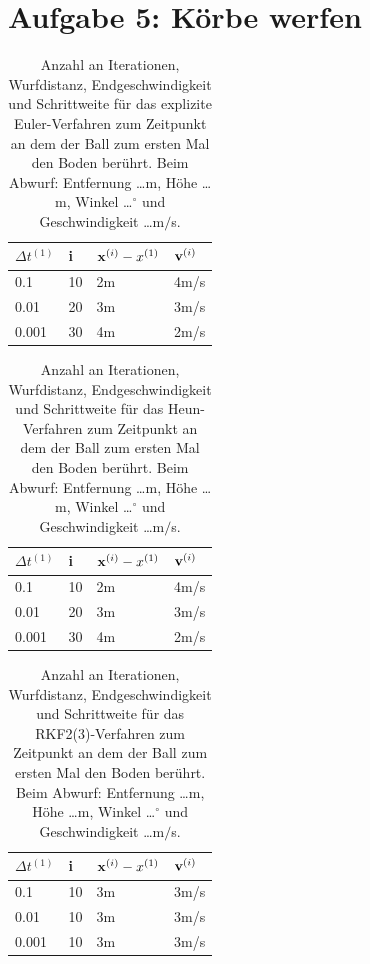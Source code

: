 \documentclass{article}
\begin{document}
\section*{Aufgabe 5: K\"orbe werfen}
\begin{table}[h!]
	\centering
	\begin{tabular}{l || l | l | l }
		\(\Delta t^{(1)}\) & i  & \({\bf x}^{(i)}-x^{(1)}\) & \({\bf v}^{(i)}\) \\
		\hline
		0.1                & 10 & 2m                        & 4m/s              \\
		0.01               & 20 & 3m                        & 3m/s              \\
		0.001              & 30 & 4m                        & 2m/s
	\end{tabular}
	\caption{Anzahl an Iterationen, Wurfdistanz, Endgeschwindigkeit und Schrittweite f\"ur das explizite Euler-Verfahren zum Zeitpunkt an dem der Ball zum ersten Mal den Boden ber\"uhrt. Beim Abwurf: Entfernung \ldots m, H\"ohe \ldots m, Winkel \ldots$^\circ$ und Geschwindigkeit \ldots m$/$s. }
	\label{tab:expEul}
\end{table}
\begin{table}[h!]
	\centering
	\begin{tabular}{l || l | l | l }
		\(\Delta t^{(1)}\) & i  & \({\bf x}^{(i)}-x^{(1)}\) & \({\bf v}^{(i)}\) \\
		\hline
		0.1                & 10 & 2m                        & 4m/s              \\
		0.01               & 20 & 3m                        & 3m/s              \\
		0.001              & 30 & 4m                        & 2m/s
	\end{tabular}
	\caption{Anzahl an Iterationen, Wurfdistanz, Endgeschwindigkeit und Schrittweite f\"ur das Heun-Verfahren zum Zeitpunkt an dem der Ball zum ersten Mal den Boden ber\"uhrt. Beim Abwurf: Entfernung \ldots m, H\"ohe \ldots m, Winkel \ldots$^\circ$ und Geschwindigkeit \ldots m$/$s. }
	\label{tab:Heun}
\end{table}
\begin{table}[h!]
	\centering
	\begin{tabular}{l || l | l | l }
		\(\Delta t^{(1)}\) & i  & \({\bf x}^{(i)}-x^{(1)}\) & \({\bf v}^{(i)}\) \\
		\hline
		0.1                & 10 & 3m                        & 3m/s              \\
		0.01               & 10 & 3m                        & 3m/s              \\
		0.001              & 10 & 3m                        & 3m/s
	\end{tabular}
	\caption{Anzahl an Iterationen, Wurfdistanz, Endgeschwindigkeit und Schrittweite f\"ur das RKF2(3)-Verfahren zum Zeitpunkt an dem der Ball zum ersten Mal den Boden ber\"uhrt. Beim Abwurf: Entfernung \ldots m, H\"ohe \ldots m, Winkel \ldots$^\circ$ und Geschwindigkeit \ldots m$/$s. }
	\label{tab:RKF2(3)}
\end{table}
\lipsum[5]
\end{document}
